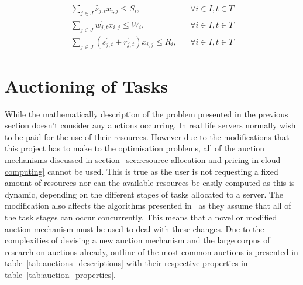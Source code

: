 \begin{align}
    \sum_{j \in J} \hat{s}_{j,t} x_{i,j} \leq S_i, && \forall{i \in I, t \in T} \label{eq:server_storage_capacity} \\
    \sum_{j \in J} w^{'}_{j,t} x_{i,j} \leq W_i, && \forall{i \in I, t \in T} \label{eq:server_computation_capacity} \\
    \sum_{j \in J} (s^{'}_{j,t} + r^{'}_{j,t}) x_{i,j} \leq R_i, && \forall{i \in I, t \in T} \label{eq:server_bandwidth_capacity}
\end{align}

\section{Auctioning of Tasks}\label{sec:auctioning-of-tasks}

While the mathematically description of the problem presented in the previous section doesn't consider any auctions
occurring. In real life servers normally wish to be paid for the use of their resources. However due to the modifications
that this project has to make to the optimisation problems, all of the auction mechanisms discussed in
section~\ref{sec:resource-allocation-and-pricing-in-cloud-computing} cannot be used. This is true as the user is not
requesting a fixed amount of resources nor can the available resources be easily computed as this is dynamic, depending
on the different stages of tasks allocated to a server. The modification also affects the algorithms presented
in~\cite{FlexibleResourceAllocation} as they assume that all of the task stages can occur concurrently. This means that
a novel or modified auction mechanism must be used to deal with these changes. Due to the complexities of devising a new
auction mechanism and the large corpus of research on auctions already, outline of the most common auctions is presented
in table~\ref{tab:auctions_descriptions} with their respective properties in table~\ref{tab:auction_properties}.


